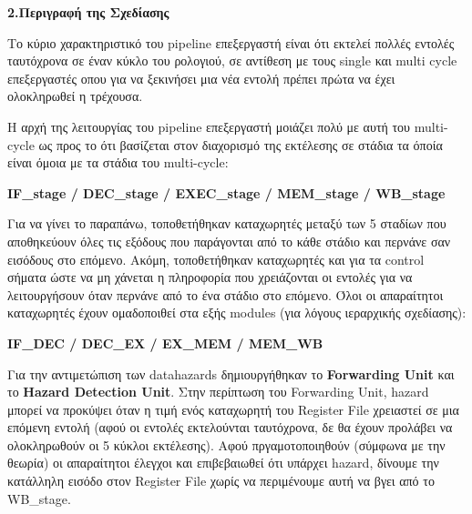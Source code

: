 { \large \bfseries 2.Περιγραφή της Σχεδίασης}\\ %

\begin{justify}
    Το κύριο χαρακτηριστικό του \textlatin{pipeline} 
    επεξεργαστή είναι ότι εκτελεί πολλές εντολές ταυτόχρονα
    σε έναν κύκλο του ρολογιού, σε αντίθεση με τους
    \textlatin{single} και \textlatin{multi}
    \textlatin{cycle} επεξεργαστές οπου για να ξεκινήσει
    μια νέα εντολή πρέπει πρώτα να έχει ολοκληρωθεί η τρέχουσα.
\end{justify}

\begin{justify}
    Η αρχή της λειτουργίας του \textlatin{pipeline} επεξεργαστή
    μοιάζει πολύ με αυτή του \textlatin{multi-cycle} ως προς
    το ότι βασίζεται στον διαχορισμό της εκτέλεσης σε
    στάδια τα όποία είναι όμοια με τα στάδια του 
    \textlatin{multi-cycle}:
\end{justify}

\begin{center}
    {\bf \textlatin{IF\_stage} / \textlatin{DEC\_stage} /
    \textlatin{EXEC\_stage} / \textlatin{MEM\_stage} /
    \textlatin{WB\_stage} }
\end{center}

\begin{justify}
    Για να γίνει το παραπάνω, τοποθετήθηκαν καταχωρητές
    μεταξύ των 5 σταδίων που αποθηκεύουν όλες τις
    εξόδους που παράγονται από το κάθε στάδιο και
    περνάνε σαν εισόδους στο επόμενο. Ακόμη, τοποθετήθηκαν
    καταχωρητές και για τα \textlatin{control} σήματα
    ώστε να μη χάνεται η πληροφορία που χρειάζονται οι εντολές
    για να λειτουργήσουν όταν περνάνε από το ένα στάδιο στο
    επόμενο. Όλοι οι απαραίτητοι καταχωρητές έχουν ομαδοποιθεί
    στα εξής \textlatin{modules} (για λόγους ιεραρχικής σχεδίασης):
\end{justify}

\begin{center}
    {\bf \textlatin{IF\_DEC} / \textlatin{DEC\_EX} /
    \textlatin{EX\_MEM} / \textlatin{MEM\_WB} }
\end{center}

\begin{justify}
    Για την αντιμετώπιση των \textlatin{datahazards} 
    δημιουργήθηκαν το {\bf \textlatin{Forwarding Unit}}
    και το {\bf \textlatin{Hazard Detection Unit}}. 
    Στην περίπτωση του \textlatin{Forwarding Unit}, 
    \textlatin{hazard} μπορεί να προκύψει όταν η τιμή ενός
    καταχωρητή του \textlatin{Register File} χρειαστεί σε 
    μια επόμενη εντολή (αφού οι εντολές εκτελούνται ταυτόχρονα,
    δε θα έχουν προλάβει να ολοκληρωθούν οι 5 κύκλοι εκτέλεσης).
    Αφού πργαμοτοποιηθούν (σύμφωνα με την θεωρία) οι απαραίτητοι
    έλεγχοι και επιβεβαιωθεί ότι υπάρχει \textlatin{hazard},
    δίνουμε την κατάλληλη εισόδο στον \textlatin{Register File} 
    χωρίς να περιμένουμε αυτή να βγει από το \textlatin{WB\_stage}.
\end{justify}

